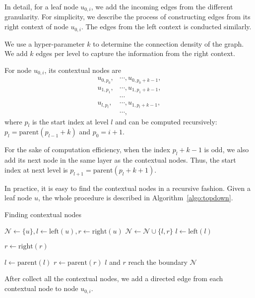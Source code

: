\documentclass[11pt,a4paper]{article}
\begin{document}
In detail, for a leaf node $u_{0,i}$, we add the incoming edges from the different granularity. For simplicity, we describe the process of constructing edges from its right context of node $u_{0,i}$. The edges from the left context is conducted similarly.

We use a hyper-parameter $k$ to determine the connection density of the graph. We add $k$ edges per level to capture the information from the right context.

For node $u_{0,i}$, its contextual nodes are
\begin{align}
 u_{0,p_0},& \cdots,u_{0,p_0+k-1},\\
  u_{1,p_1},&\cdots,u_{1,p_1+k-1},\\
  & \cdots\\
 u_{l,p_l},&\cdots,u_{1,p_l+k-1},\\
 &\cdots,
\end{align}
where $p_l$ is the start index at level $l$ and can be computed recursively: $p_l=\mathrm{parent}(p_{l-1}+k)$ and $p_0=i+1$.

For the sake of computation efficiency, when the index $p_l+k-1$ is odd, we also add its next node in the same layer as the contextual nodes. Thus, the start index at next level is $p_{l+1}=\mathrm{parent}(p_{l}+k+1)$.




In practice, it is easy to find the contextual nodes in a recursive fashion.
Given a leaf node $u$, the whole procedure is described in Algorithm~\ref{algo:topdown}.

\begin{algorithm}[!ht]
\begin{algorithmic}
\caption{Finding contextual nodes}
\label{algo:topdown}
\State $\mathcal{N} \gets \{u\}, l \gets \mathrm{left}(u), r \gets \mathrm{right}(u)$
\Repeat
{}
\State $\mathcal{N} \gets \mathcal{N} \cup \{l, r\}$
\State $l \gets \mathrm{left}(l)$

\State $r \gets \mathrm{right}(r)$

\EndFor
\State $l \gets \mathrm{parent}(l)$
\State $r \gets \mathrm{parent}(r)$
\Until $l$ and $r$ reach the boundary
\State \Return $\mathcal{N}$
\EndFunction
\end{algorithmic}
\end{algorithm}

After collect all the contextual nodes, we add a directed edge from each contextual node to node $u_{0,i}$.
\end{document}
